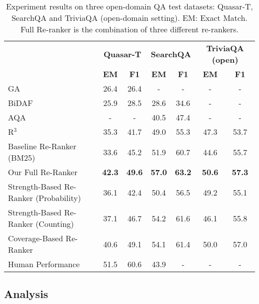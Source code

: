 \documentclass{article} \usepackage{iclr2018_conference,times}
\begin{document}
\begin{table*}[t]
\centering
\begin{tabular}{lcccccc}
\toprule
                  & \multicolumn{2}{c}{\bf Quasar-T} & \multicolumn{2}{c}{\bf SearchQA} & \multicolumn{2}{c}{\bf TriviaQA (open)}\\
                  & \bf EM            & \bf F1            & \bf EM            & \bf F1 & \bf EM            & \bf F1 \\
\midrule
GA~\citep{dhingra2016gated}               & 26.4          & 26.4          & -             & -  & -             & - \\
BiDAF~\citep{seo2016bidirectional}           & 25.9          & 28.5          & 28.6             & 34.6  & -             & - \\
AQA~\citep{buck2017ask}           & -          & -          & 40.5             & 47.4  & -             & - \\

R$^3$~\citep{wang2017r}             & 35.3 & 41.7 &49.0 &55.3  & 47.3             & 53.7\\
\midrule
Baseline Re-Ranker (BM25) & 33.6 & 45.2 & 51.9 & 60.7  & 44.6 &       55.7        \\
 \midrule
Our Full Re-Ranker  &  \textbf{42.3} & \textbf{49.6} & \textbf{57.0} & \textbf{63.2}   & \textbf{50.6}             & \textbf{57.3} \\
\quad Strength-Based Re-Ranker (Probability) & 36.1 & 42.4 & 50.4 & 56.5 & 49.2             & 55.1\\
\quad Strength-Based Re-Ranker (Counting)      & 37.1         & 46.7          & 54.2 & 61.6       & 46.1             & 55.8\\
\quad Coverage-Based Re-Ranker  & 40.6 & 49.1 & 54.1 & 61.4   & 50.0            & 57.0  \\
\midrule
 Human Performance & 51.5 &60.6 &43.9 & - & - & -\\
\bottomrule
\end{tabular}
\normalsize
\caption[Caption for LOF]{Experiment results on three open-domain QA test datasets: Quasar-T, SearchQA and TriviaQA (open-domain setting). EM: Exact Match.  Full Re-ranker is the combination of three different re-rankers.}
\label{tab:results}
\end{table*}



\subsection{Analysis}
\end{document}
